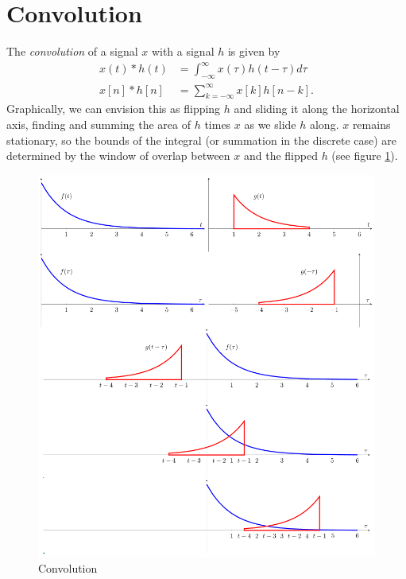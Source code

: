 \section{Convolution}

The \emph{convolution} of a signal $x$ with a signal $h$ is given by
\begin{align}
    x(t) * h(t) & = \int_{-\infty}^{\infty} x(\tau) h(t - \tau) d\tau \\
    x[n] * h[n] & = \sum_{k=-\infty}^{\infty} x[k] h[n - k].
\end{align}
Graphically, we can envision this as flipping $h$ and sliding it
along the horizontal axis, finding and summing the area of $h$
times $x$ as we slide $h$ along. $x$ remains stationary, so the
bounds of the integral (or summation in the discrete case) are determined
by the window of overlap between $x$ and the flipped $h$
(see figure \ref{fig:convolution}).

\begin{figure}[h]
    \centering
    \includegraphics{images/Convolution3.svg.png}
    \caption{Convolution}
    \label{fig:convolution}
\end{figure}



